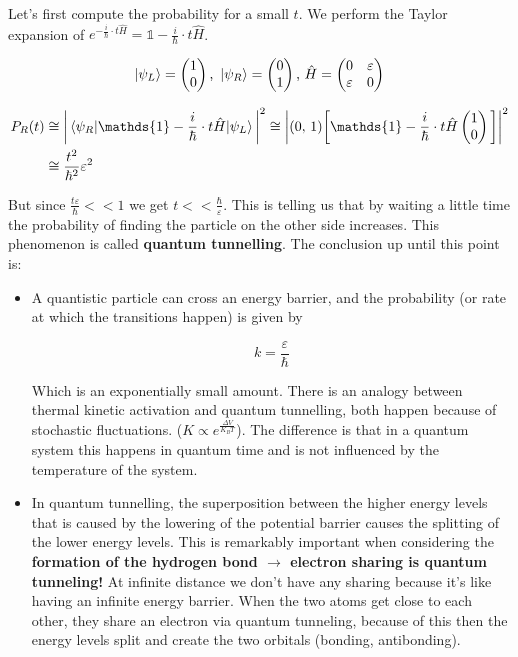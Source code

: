 	Let's first compute the probability for a small $t$.
	We perform the Taylor expansion of $e^{-\frac{i}{\hbar}\cdot t \hat{H}} = \mathds{1} -\frac{i}{\hbar}\cdot t\hat{H}$.

	$$\ket{\psi_L}=\begin{pmatrix}1\\0\end{pmatrix}\text{, }\ket{\psi_R}=\begin{pmatrix}0\\1\end{pmatrix}\text{, }\hat{H}=\begin{pmatrix}0 & \varepsilon\\ \varepsilon & 0\end{pmatrix}$$

	\begin{align*}
		P_R(t)&\cong\bigg|\mel{\psi_R}{\mathds{1}-\frac{i}{\hbar}\cdot t \hat{H}}{\psi_L}\bigg|^2 \cong\bigg|(0,\,1) \bigg[\mathds{1}-\frac{i}{\hbar}\cdot t\hat{H}\begin{pmatrix}1\\0\end{pmatrix}\bigg]\bigg|^2\\
					&\cong \frac{t^2}{\hbar^2}\varepsilon^2
	\end{align*}

	But since $\frac{t\varepsilon}{\hbar}<<1$ we get $t << \frac{\hbar}{\varepsilon}$.
	This is telling us that by waiting a little time the probability of finding the particle on the other side increases.
	This phenomenon is called \textbf{quantum tunnelling}.
	The conclusion up until this point is:

	\begin{multicols}{2}
		\begin{itemize}
			\item A quantistic particle can cross an energy barrier, and the probability (or rate at which the transitions happen) is given by

				$$k=\frac{\varepsilon}{\hbar}$$

				Which is an exponentially small amount.
				There is an analogy between thermal kinetic activation and quantum tunnelling, both happen because of stochastic fluctuations.
				($K\propto e^{\frac{\Delta V}{K_B T}}$).
				The difference is that in a quantum system this happens in quantum time and is not influenced by the temperature of the system.
			\item In quantum tunnelling, the superposition between the higher energy levels that is caused by the lowering of the potential barrier causes the splitting of the lower energy levels.
				This is remarkably important when considering the \textbf{formation of the hydrogen bond $\rightarrow$ electron sharing is quantum tunneling!}
				At infinite distance we don't have any sharing because it's like having an infinite energy barrier.
				When the two atoms get close to each other, they share an electron via quantum tunneling, because of this then the energy levels split and create the two orbitals (bonding, antibonding).
		\end{itemize}
	\end{multicols}

